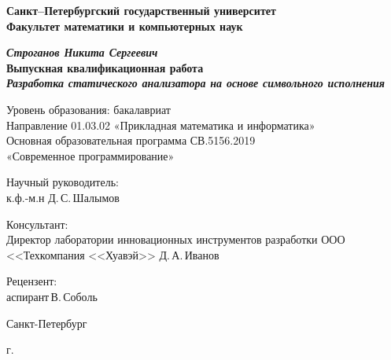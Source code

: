 \begin{titlepage}
\begin{center}

\textbf{Санкт--Петербургский государственный университет}\\
\textbf{Факультет математики и компьютерных наук}


\vspace{35mm}

\textbf{\textit{\large Строганов Никита Сергеевич}} \\[8mm]
\textbf{\large Выпускная квалификационная работа}\\[3mm]
\textbf{\textit{\large Разработка статического анализатора на основе символьного исполнения}}

\vspace{20mm}
Уровень образования: бакалавриат\\
Направление 01.03.02 «Прикладная математика и информатика»\\
Основная образовательная программа СВ.5156.2019\\
«Современное программирование»\\[25mm]
\end{center}

\begin{flushright}
\begin{minipage}[t]{0.72\textwidth}
{Научный руководитель:} \\
к.ф.-м.н Д.\,С.\,Шалымов
\vspace{6mm}

{Консультант:} \\
Директор лаборатории инновационных инструментов разработки ООО <<Техкомпания <<Хуавэй>> Д.\,А.\,Иванов
\vspace{6mm}

{Рецензент:} \\
аспирант\,В.\,Соболь
\end{minipage}
\end{flushright}

\vfill

\begin{center}
{Санкт-Петербург}
\par{\the\year{} г.}
\end{center}
\end{titlepage}
\restoregeometry
\addtocounter{page}{1}
